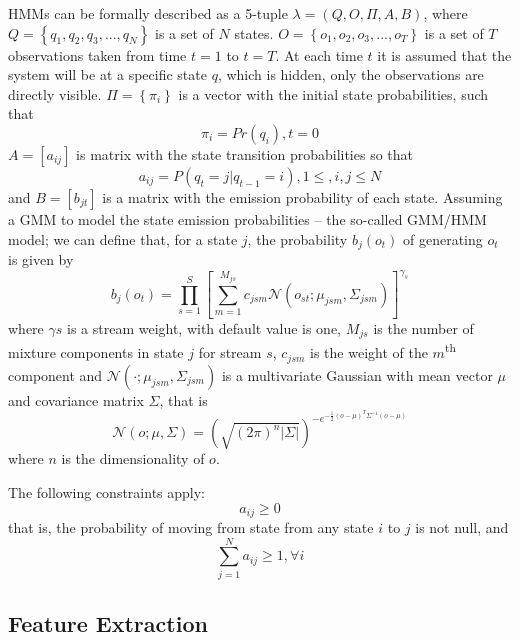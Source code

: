\ac{HMM}s can be formally described as a 5-tuple $\lambda = \left (Q, O, \Pi, A, B\right )$, where $Q = \left \{q_1, q_2, q_3, ..., q_N\right \}$  is a set of $N$ states. $O = \left \{o_1, o_2, o_3, ..., o_T\right \}$ is a set of $T$ observations taken from time $t = 1$ to $t = T$. At each time $t$ it is assumed that the system will be at a specific state $q$, which is hidden, only the observations are directly visible. $\Pi = \left \{\pi_i \right \}$ is a vector with the initial state probabilities, such that
\begin{equation}
\pi_i = Pr(q_i), t = 0
\end{equation}
$A = [a_{ij}]$ is matrix with the state transition probabilities so that
\begin{equation}
a_{ij} = P(q_t = j | q_{t-1} = i),  1 \leq, i, j \leq N
\end{equation}
and $B = [b_{jt}]$ is a matrix with the emission probability of each state. Assuming a \ac{GMM} to model the state emission probabilities -- the so-called GMM/HMM model; we can define that, for a state $j$, the probability $b_j(o_t)$ of generating $o_t$ is given by
\begin{equation}
 b_j(o_t) = \prod_{s=1}^{S}\left [ \sum_{m=1}^{M_{js}} c_{jsm}\mathcal{N}(o_{st}; \mu_{jsm}, \Sigma_{jsm}) \right ]^{\gamma_s}
\end{equation}
where $\gamma s$ is a stream weight, with default value is one, $M_{js}$ is the number of mixture components in state $j$ for stream $s$, $c_{jsm}$ is the weight of the $m$\textsuperscript{th} component and $\mathcal{N}(\cdot; \mu_{jsm}, \Sigma_{jsm})$ is a multivariate Gaussian with mean vector $\mu$ and covariance matrix $\Sigma$, that is
\begin{equation}
 \mathcal{N}(o; \mu, \Sigma) = (\sqrt{(2\pi)^{n}\left |\Sigma\right |})^{-e^{-\frac{1}{2}(o-\mu)^{T}\Sigma^{-1}(o-\mu)}}
\end{equation}
where $n$ is the dimensionality of $o$.

The following constraints apply:
\begin{equation}
a_{ij} \geq 0
\end{equation}
that is, the probability of moving from state from any state $i$ to $j$ is not null, and
\begin{equation}
\sum_{j=1}^{N} a_{ij} \geq 1, \forall i
\end{equation}

\subsection{Feature Extraction}

